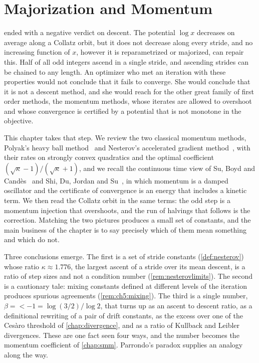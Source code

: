 \chapter{Majorization and Momentum}\label{chap:momentum}

 ended with a negative verdict on descent.  The potential
$\log x$ decreases on average along a Collatz orbit, but it does not decrease
along every stride, and no increasing function of $x$, however it is
reparametrized or majorized, can repair this.  Half of all odd integers ascend
in a single stride, and ascending strides can be chained to any length.  An
optimizer who met an iteration with these properties would not conclude that
it fails to converge.  She would conclude that it is not a descent method, and
she would reach for the other great family of first order methods, the
momentum methods, whose iterates are allowed to overshoot and whose
convergence is certified by a potential that is not monotone in the objective.

This chapter takes that step.  We review the two classical momentum methods,
Polyak's heavy ball method~\cite{polyak1964} and Nesterov's accelerated
gradient method~\cite{nesterov1983}, with their rates on strongly convex
quadratics and the optimal coefficient $(\sqrt\kappa-1)/(\sqrt\kappa+1)$, and
we recall the continuous time view of Su, Boyd and Cand\`es~\cite{su2016} and
Shi, Du, Jordan and Su~\cite{shi2022}, in which momentum is a damped
oscillator and the certificate of convergence is an energy that includes a
kinetic term.  We then read the Collatz orbit in the same terms: the odd step
is a momentum injection that overshoots, and the run of halvings that follows
is the correction.  Matching the two pictures produces a small set of
constants, and the main business of the chapter is to say precisely which of
them mean something and which do not.

Three conclusions emerge.  The first is a set of stride constants
(\cref{def:nesterov}) whose ratio $\kappa\approx1.776$, the largest ascent of a
stride over its mean descent, is a ratio of step sizes and not a condition
number (\cref{rem:nesterovlimits}).  The second is a cautionary
tale: mixing constants defined at different levels of the iteration produces
spurious agreements (\cref{rem:ch5:mixing}).  The third is a single
number, $\beta=\lt-1=\log(3/2)/\log 2$, that turns up as an ascent to descent
ratio, as a definitional rewriting of a pair of drift constants, as the
excess over one of the Ces\`aro threshold of \cref{chap:divergence}, and as a
ratio of Kullback and Leibler divergences.  These are one fact seen four
ways, and the number becomes the momentum coefficient of \cref{chap:smm}.
Parrondo's paradox supplies an analogy along the way.

